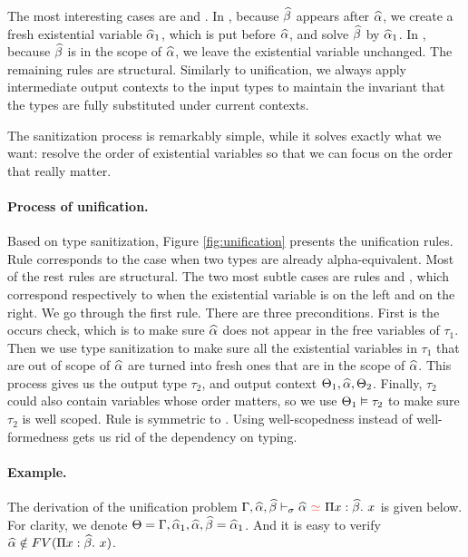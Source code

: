 The most interesting cases are  and . In
, because $\widehat{\beta}$ appears after $\widehat{\alpha}$, we create a fresh
existential variable $\widehat{\alpha}_1$, which is put before $\widehat{\alpha}$, and solve $\widehat{\beta}$
by $\widehat{\alpha}_1$. In , because $\widehat{\beta}$ is in the scope of $\widehat{\alpha}$,
we leave the existential variable unchanged.
The remaining rules are structural.
Similarly to unification, we always apply intermediate output
contexts to the input types to maintain the invariant that the types are fully
substituted under current contexts.

The sanitization process is remarkably simple, while it solves exactly what we
want: resolve the order of existential variables so that we can focus on the
order that really matter.

\paragraph{Process of unification.}

Based on type sanitization, Figure \ref{fig:unification} presents the
unification rules.
Rule  corresponds to the case when two types are already
alpha-equivalent. Most of the rest rules are structural. The two most subtle cases
are rules  and , which correspond respectively to
when the existential variable is on the left and on the right. We go through the
first rule. There are three preconditions. First is the occurs check, which is to
make sure $\widehat{\alpha}$ does not appear in the free variables of $\tau_1$. Then we use
type sanitization to make sure all the existential variables in $\tau_1$ that
are out of scope of $\widehat{\alpha}$ are turned into fresh ones that are in the scope of
$\widehat{\alpha}$. This process gives us the output type $\tau_2$, and output context
$\Theta_1, \widehat{\alpha}, \Theta_2$. Finally, $\tau_2$ could also contain variables whose
order matters, so we use $\Theta_1 \vDash \tau_2$ to make sure $\tau_2$ is well
scoped. Rule  is symmetric to . Using
well-scopedness instead of well-formedness gets us rid of the dependency on
typing.

\paragraph{Example.}

The derivation of the unification problem $\tctx, \genA, \genB \bysuni \genA
\uni \bpi x \genB x$ is given below. For clarity, we denote $\Theta =
\Gamma,\widehat{\alpha}_1,\widehat{\alpha},\widehat{\beta} =\widehat{\alpha}_1$. And it is easy to verify $\widehat{\alpha} \notin
FV(\Pi x:\widehat{\beta}.~ x)$.

